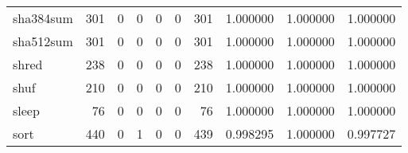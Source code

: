 \begin{tabular}{lrrrrrrrrr}
sha384sum &                                   301 &                                                  0 &                                                  0 &                                                  0 &                                                  0 &                                                301 &                                           1.000000 &                               1.000000 &                             1.000000 \\
sha512sum &                                   301 &                                                  0 &                                                  0 &                                                  0 &                                                  0 &                                                301 &                                           1.000000 &                               1.000000 &                             1.000000 \\
shred     &                                   238 &                                                  0 &                                                  0 &                                                  0 &                                                  0 &                                                238 &                                           1.000000 &                               1.000000 &                             1.000000 \\
shuf      &                                   210 &                                                  0 &                                                  0 &                                                  0 &                                                  0 &                                                210 &                                           1.000000 &                               1.000000 &                             1.000000 \\
sleep     &                                    76 &                                                  0 &                                                  0 &                                                  0 &                                                  0 &                                                 76 &                                           1.000000 &                               1.000000 &                             1.000000 \\
sort      &                                   440 &                                                  0 &                                                  1 &                                                  0 &                                                  0 &                                                439 &                                           0.998295 &                               1.000000 &                             0.997727 \\

\end{tabular}
